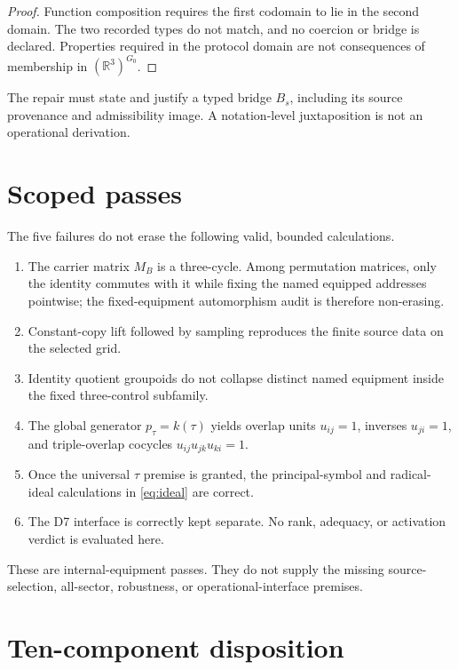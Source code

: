 \documentclass[11pt]{article}
\newcommand{\R}{\mathbb{R}}
\begin{document}
\begin{proof}
Function composition requires the first codomain to lie in the second domain.
The two recorded types do not match, and no coercion or bridge is declared.
Properties required in the protocol domain are not consequences of membership
in \((\R^3)^{G_0}\).
\end{proof}

The repair must state and justify a typed bridge \(B_s\), including its source
provenance and admissibility image.  A notation-level juxtaposition is not an
operational derivation.

\section{Scoped passes}

The five failures do not erase the following valid, bounded calculations.
\begin{enumerate}[leftmargin=2.2em]
  \item The carrier matrix \(M_B\) is a three-cycle.  Among permutation
        matrices, only the identity commutes with it while fixing the named
        equipped addresses pointwise; the fixed-equipment automorphism audit
        is therefore non-erasing.
  \item Constant-copy lift followed by sampling reproduces the finite source
        data on the selected grid.
  \item Identity quotient groupoids do not collapse distinct named equipment
        inside the fixed three-control subfamily.
  \item The global generator \(p_\tau=k(\tau)\) yields overlap units
        \(u_{ij}=1\), inverses \(u_{ji}=1\), and triple-overlap cocycles
        \(u_{ij}u_{jk}u_{ki}=1\).
  \item Once the universal \(\tau\) premise is granted, the principal-symbol
        and radical-ideal calculations in \eqref{eq:ideal} are correct.
  \item The D7 interface is correctly kept separate.  No rank, adequacy, or
        activation verdict is evaluated here.
\end{enumerate}

These are internal-equipment passes.  They do not supply the missing
source-selection, all-sector, robustness, or operational-interface premises.

\section{Ten-component disposition}
\end{document}
